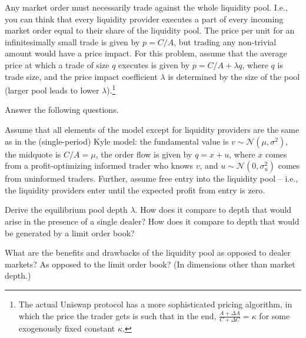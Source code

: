 	Any market order must necessarily trade against the whole liquidity pool. I.e., you can think that every liquidity provider executes a part of every incoming market order equal to their share of the liquidity pool. The price per unit for an infinitesimally small trade is given by $p=C/A$, but trading any non-trivial amount would have a price impact. For this problem, assume that the average price at which a trade of size $q$ executes is given by $p = C/A + \lambda q$, where $q$ is trade size, and the price impact coefficient $\lambda$ is determined by the size of the pool (larger pool leads to lower $\lambda$).\footnote{The actual Uniswap protocol has a more sophisticated pricing algorithm, in which the price the trader gets is such that in the end, $\frac{A+\varDelta A}{C+\varDelta C} = \kappa$ for some exogenously fixed constant $\kappa$.}
	
	Answer the following questions.
	\begin{questions}
		\question Assume that all elements of the model except for liquidity providers are the same as in the (single-period) Kyle model: the fundamental value is $v \sim \mathcal{N}(\mu,\sigma^2)$, the midquote is $C/A=\mu$, the order flow is given by $q=x+u$, where $x$ comes from a profit-optimizing informed trader who knows $v$, and $u \sim \mathcal{N}(0,\sigma^2_u)$ comes from uninformed traders. Further, assume free entry into the liquidity pool -- i.e., the liquidity providers enter until the expected profit from entry is zero. 
		
		Derive the equilibrium pool depth $\lambda$. How does it compare to depth that would arise in the presence of a single dealer? How does it compare to depth that would be generated by a limit order book?
		
		\question What are the benefits and drawbacks of the liquidity pool as opposed to dealer markets? As opposed to the limit order book? (In dimensions other than market depth.)
	\end{questions}


